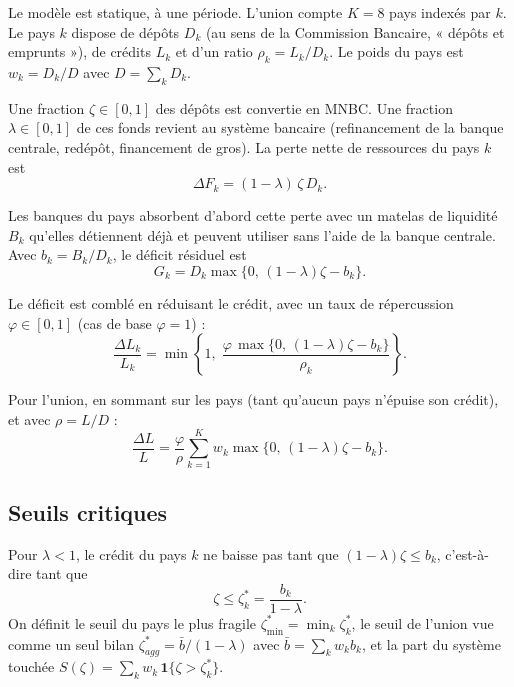 \documentclass[11pt,a4paper]{article}
\newcommand{\zs}{\zeta^{*}}
\begin{document}
	Le modèle est statique, à une période. L'union compte $K=8$ pays indexés par $k$. Le pays $k$ dispose de dépôts $D_k$ (au sens de la Commission Bancaire, « dépôts et emprunts »), de crédits $L_k$ et d'un ratio $\rho_k=L_k/D_k$. Le poids du pays est $w_k=D_k/D$ avec $D=\sum_k D_k$.
	
	Une fraction $\zeta\in[0,1]$ des dépôts est convertie en MNBC. Une fraction $\lambda\in[0,1]$ de ces fonds revient au système bancaire (refinancement de la banque centrale, redépôt, financement de gros). La perte nette de ressources du pays $k$ est
	\begin{equation}\label{eq:perte}
		\Delta F_k=(1-\lambda)\,\zeta\,D_k .
	\end{equation}
	
	Les banques du pays absorbent d'abord cette perte avec un matelas de liquidité $B_k$ qu'elles détiennent déjà et peuvent utiliser sans l'aide de la banque centrale. Avec $b_k=B_k/D_k$, le déficit résiduel est
	\begin{equation}\label{eq:deficit}
		G_k=D_k\max\{0,\,(1-\lambda)\zeta-b_k\}.
	\end{equation}
	
	Le déficit est comblé en réduisant le crédit, avec un taux de répercussion $\varphi\in[0,1]$ (cas de base $\varphi=1$) :
	\begin{equation}\label{eq:credit}
		\frac{\Delta L_k}{L_k}=\min\left\{1,\;\frac{\varphi\,\max\{0,\,(1-\lambda)\zeta-b_k\}}{\rho_k}\right\}.
	\end{equation}
	
	Pour l'union, en sommant sur les pays (tant qu'aucun pays n'épuise son crédit), et avec $\rho=L/D$ :
	\begin{equation}\label{eq:union}
		\frac{\Delta L}{L}=\frac{\varphi}{\rho}\sum_{k=1}^{K}w_k\max\{0,\,(1-\lambda)\zeta-b_k\}.
	\end{equation}
	
	\subsection{Seuils critiques}
	
	Pour $\lambda<1$, le crédit du pays $k$ ne baisse pas tant que $(1-\lambda)\zeta\le b_k$, c'est-à-dire tant que
	\begin{equation}\label{eq:seuil}
		\zeta\le\zs_k=\frac{b_k}{1-\lambda}.
	\end{equation}
	On définit le seuil du pays le plus fragile $\zs_{\min}=\min_k\zs_k$, le seuil de l'union vue comme un seul bilan $\zs_{agg}=\bar b/(1-\lambda)$ avec $\bar b=\sum_k w_k b_k$, et la part du système touchée $S(\zeta)=\sum_k w_k\,\mathbf 1\{\zeta>\zs_k\}$.
	
\end{document}
